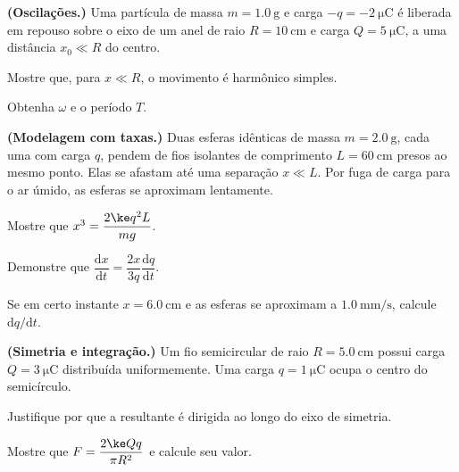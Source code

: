 \begin{questao}[4]{}

\textbf{(Oscilações.)} Uma partícula de massa $m=\SI{1.0}{\gram}$ e carga
$-q=\SI{-2}{\micro\coulomb}$ é liberada em repouso sobre o eixo de um anel de
raio $R=\SI{10}{\centi\meter}$ e carga $Q=\SI{5}{\micro\coulomb}$, a uma
distância $x_0\ll R$ do centro.
\begin{itensq}
\item Mostre que, para $x\ll R$, o movimento é harmônico simples.
\item Obtenha $\omega$ e o período $T$.
\end{itensq}


\end{questao}
\begin{questao}[4]{}

\textbf{(Modelagem com taxas.)} Duas esferas idênticas de massa
$m=\SI{2.0}{\gram}$, cada uma com carga $q$, pendem de fios isolantes de
comprimento $L=\SI{60}{\centi\meter}$ presos ao mesmo ponto. Elas se afastam até
uma separação $x\ll L$. Por fuga de carga para o ar úmido, as esferas se
aproximam lentamente.
\begin{itensq}
\item Mostre que $x^{3}=\dfrac{2\ke q^{2}L}{mg}$.
\item Demonstre que
      $\dfrac{\mathrm{d} x}{\mathrm{d} t}=\dfrac{2x}{3q}\dfrac{\mathrm{d} q}{\mathrm{d} t}$.
\item Se em certo instante $x=\SI{6.0}{\centi\meter}$ e as esferas se aproximam
      a $\SI{1.0}{\milli\meter\per\second}$, calcule $\mathrm{d} q/\mathrm{d} t$.
\end{itensq}


\end{questao}
\begin{questao}[4]{}

\textbf{(Simetria e integração.)} Um fio semicircular de raio
$R=\SI{5.0}{\centi\meter}$ possui carga $Q=\SI{3}{\micro\coulomb}$ distribuída
uniformemente. Uma carga $q=\SI{1}{\micro\coulomb}$ ocupa o centro do
semicírculo.
\begin{itensq}
\item Justifique por que a resultante é dirigida ao longo do eixo de simetria.
\item Mostre que $F=\dfrac{2\ke Qq}{\pi R^{2}}$ e calcule seu valor.
\end{itensq}


\end{questao}
